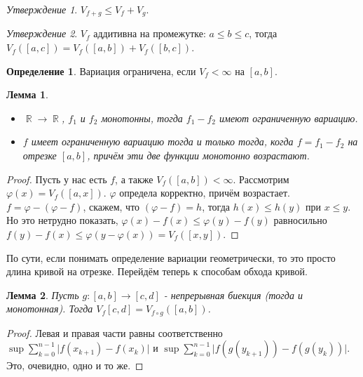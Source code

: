 \documentclass[a4paper,100pt]{article}
\theoremstyle{indented}
\newtheorem{lemma}{Лемма}
\theoremstyle{definition}
\newtheorem{defn}{Определение}
\theoremstyle{remark}
\newtheorem{stat}{Утверждение}
\DeclareMathOperator{\RR}{\mathbb{R}}
\begin{document}
\begin{stat}
    $V_{f+g}\leq V_f+V_g$.
\end{stat}

\begin{stat}
    $V_f$ аддитивна на промежутке: $a\leq b\leq c$, тогда $V_f([a, c])=V_f([a, b])+V_f([b, c])$. 
\end{stat}

\begin{defn}
    Вариация ограничена, если $V_f<\infty $ на $[a, b]$.
\end{defn}

\begin{lemma}\
    
    \begin{itemize} 
        \item $\RR\rightarrow \RR$, $f_1$ и $f_2$ монотонны, тогда $f_1-f_2$ имеют ограниченную вариацию.
        \item $f$ имеет ограниченную вариацию тогда и только тогда, когда $f=f_1-f_2$ на отрезке $[a, b]$, причём эти две функции монотонно возрастают.
    \end{itemize}
\end{lemma}

\begin{proof}
    Пусть у нас есть $f$, а также $V_f([a, b])<\infty$. Рассмотрим $\varphi(x)=V_f([a, x])$. $\varphi$ определа корректно, причём возрастает. $f=\varphi-(\varphi-f)$, скажем, что $(\varphi-f)=h$, тогда $h(x)\leq h(y)$ при $x\leq y$. Но это нетрудно показать, $\varphi(x)-f(x)\leq \varphi(y)-f(y)$ равносильно $f(y)-f(x)\leq \varphi(y-\varphi(x))=V_f([x, y])$.
\end{proof}

По сути, если понимать определение вариации геометрически, то это просто длина кривой на отрезке. Перейдём теперь к способам обхода кривой.\\

\begin{lemma}
    Пусть $g:[a, b]\rightarrow [c, d]$ - непрерывная биекция (тогда и монотонная). Тогда $V_f[c, d]=V_{f\circ g}([a,b])$.
\end{lemma}

\begin{proof}
    Левая и правая части равны соответственно $\sup \sum_{k=0}^{n-1}\vert f(x_{k+1})-f(x_k)\vert$ и $\sup \sum_{k=0}^{n-1}\vert f(g(y_{k+1}))-f(g(y_k))\vert$. Это, очевидно, одно и то же.
\end{proof}
\end{document}
